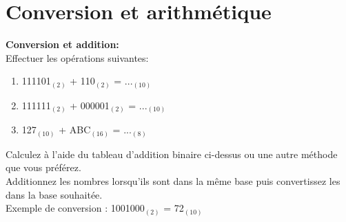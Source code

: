 \section{Conversion et arithmétique}
\begin{Exercice}[20 minutes] \textbf{Conversion et addition:}\\
    Effectuer les opérations suivantes:
    \begin{enumerate}
        \item 111101$_{(2)}$ + 110$_{(2)}$ = ...$_{(10)}$
        \item 111111$_{(2)}$ + 000001$_{(2)}$ = ...$_{(10)}$
        \item 127$_{(10)}$ + ABC$_{(16)}$ = ...$_{(8)}$
    \end{enumerate}
    \begin{conseil}
        Calculez à l'aide du tableau d'addition binaire ci-dessus ou une autre méthode que vous préférez.\\
        Additionnez les nombres lorsqu'ils sont dans la même base puis convertissez les dans la base souhaitée.\\
        
        Exemple de conversion : 1001000$_{(2)}$ = 72$_{(10)}$\\


\end{conseil}
\end{Exercice}
